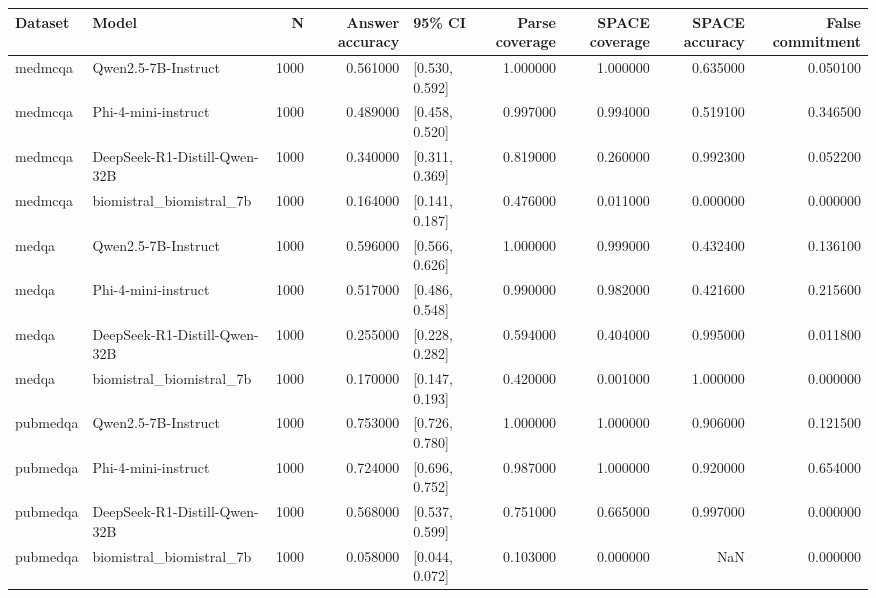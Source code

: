 \begin{tabular}{llrrlrrrr}
\toprule
Dataset & Model & N & Answer accuracy & 95\% CI & Parse coverage & SPACE coverage & SPACE accuracy & False commitment \\
\midrule
medmcqa & Qwen2.5-7B-Instruct & 1000 & 0.561000 & [0.530, 0.592] & 1.000000 & 1.000000 & 0.635000 & 0.050100 \\
medmcqa & Phi-4-mini-instruct & 1000 & 0.489000 & [0.458, 0.520] & 0.997000 & 0.994000 & 0.519100 & 0.346500 \\
medmcqa & DeepSeek-R1-Distill-Qwen-32B & 1000 & 0.340000 & [0.311, 0.369] & 0.819000 & 0.260000 & 0.992300 & 0.052200 \\
medmcqa & biomistral\_biomistral\_7b & 1000 & 0.164000 & [0.141, 0.187] & 0.476000 & 0.011000 & 0.000000 & 0.000000 \\
medqa & Qwen2.5-7B-Instruct & 1000 & 0.596000 & [0.566, 0.626] & 1.000000 & 0.999000 & 0.432400 & 0.136100 \\
medqa & Phi-4-mini-instruct & 1000 & 0.517000 & [0.486, 0.548] & 0.990000 & 0.982000 & 0.421600 & 0.215600 \\
medqa & DeepSeek-R1-Distill-Qwen-32B & 1000 & 0.255000 & [0.228, 0.282] & 0.594000 & 0.404000 & 0.995000 & 0.011800 \\
medqa & biomistral\_biomistral\_7b & 1000 & 0.170000 & [0.147, 0.193] & 0.420000 & 0.001000 & 1.000000 & 0.000000 \\
pubmedqa & Qwen2.5-7B-Instruct & 1000 & 0.753000 & [0.726, 0.780] & 1.000000 & 1.000000 & 0.906000 & 0.121500 \\
pubmedqa & Phi-4-mini-instruct & 1000 & 0.724000 & [0.696, 0.752] & 0.987000 & 1.000000 & 0.920000 & 0.654000 \\
pubmedqa & DeepSeek-R1-Distill-Qwen-32B & 1000 & 0.568000 & [0.537, 0.599] & 0.751000 & 0.665000 & 0.997000 & 0.000000 \\
pubmedqa & biomistral\_biomistral\_7b & 1000 & 0.058000 & [0.044, 0.072] & 0.103000 & 0.000000 & NaN & 0.000000 \\
\bottomrule
\end{tabular}

